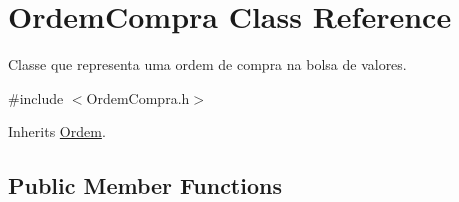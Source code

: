 \hypertarget{class_ordem_compra}{}\section{Ordem\+Compra Class Reference}
\label{class_ordem_compra}


Classe que representa uma ordem de compra na bolsa de valores.  




{\ttfamily \#include $<$Ordem\+Compra.\+h$>$}



Inherits \hyperlink{class_ordem}{Ordem}.

\subsection*{Public Member Functions}
